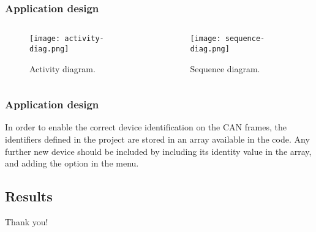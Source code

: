 \begin{frame}
	\frametitle{Application design}
	\begin{columns}
		\begin{column}{0.5\textwidth}
			\begin{figure}
				\texttt{[image: activity-diag.png]}
				\caption{Activity diagram.}\label{fig:activity-diag}
			\end{figure}
		\end{column}
		\begin{column}{0.5\textwidth}
			\begin{figure}
				\texttt{[image: sequence-diag.png]}
				\caption{Sequence diagram.}\label{fig:sequence-diag}
			\end{figure}
		\end{column}
	\end{columns}
\end{frame}

\begin{frame}
	\frametitle{Application design}
	In order to enable the correct device identification on the CAN frames, the identifiers defined in the project are stored in an array available in the code. Any further new device should be included by including its identity value in the array, and adding the option in the menu.
	\vfill
	
\end{frame}

\subsection{Results}

\begin{frame}[standout]
	Thank you!
\end{frame}
